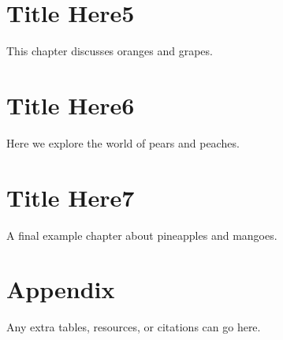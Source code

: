 \documentclass[10pt,openany]{book}
\begin{document}
\chapter{Title Here5}
This chapter discusses oranges and grapes.

\lipsum[2]

\chapter{Title Here6}
Here we explore the world of pears and peaches.

\lipsum[3]

\chapter{Title Here7}
A final example chapter about pineapples and mangoes.

\lipsum[4]















\backmatter

\chapter{Appendix}
Any extra tables, resources, or citations can go here.

\lipsum[1]  %








\printindex
\end{document}
